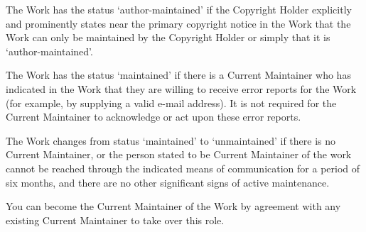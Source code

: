 \begin{LPPLicense}
    \label{LPPL:Maintenance}

    The Work has the status `author-maintained' if the Copyright Holder
    explicitly and prominently states near the primary copyright notice in the
    Work that the Work can only be maintained by the Copyright Holder or simply
    that it is `author-maintained'.

    The Work has the status `maintained' if there is a Current Maintainer who
    has indicated in the Work that they are willing to receive error reports
    for the Work (for example, by supplying a valid e-mail address). It is not
    required for the Current Maintainer to acknowledge or act upon these error
    reports.

    The Work changes from status `maintained' to `unmaintained' if there is no
    Current Maintainer, or the person stated to be Current Maintainer of the
    work cannot be reached through the indicated means of communication for a
    period of six months, and there are no other significant signs of active
    maintenance.

    You can become the Current Maintainer of the Work by agreement with any
    existing Current Maintainer to take over this role.


\end{LPPLicense}
